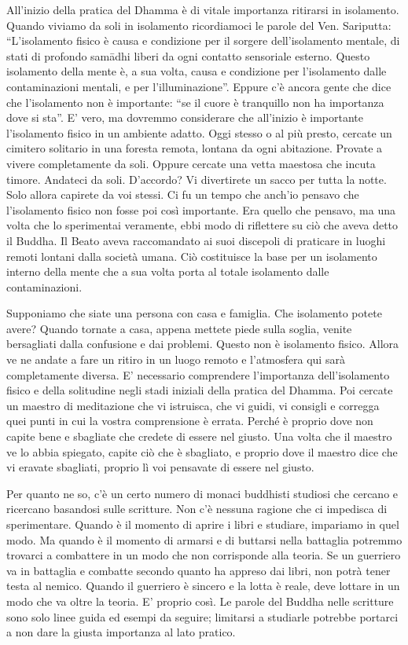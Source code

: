 All'inizio della pratica del Dhamma è di vitale importanza ritirarsi in
isolamento. Quando viviamo da soli in isolamento ricordiamoci le parole
del Ven. Sariputta: ``L'isolamento fisico è causa e condizione per il
sorgere dell'isolamento mentale, di stati di profondo samādhi liberi da
ogni contatto sensoriale esterno. Questo isolamento della mente è, a sua
volta, causa e condizione per l'isolamento dalle contaminazioni mentali,
e per l'illuminazione''. Eppure c'è ancora gente che dice che
l'isolamento non è importante: ``se il cuore è tranquillo non ha
importanza dove si sta''. E' vero, ma dovremmo considerare che
all'inizio è importante l'isolamento fisico in un ambiente adatto. Oggi
stesso o al più presto, cercate un cimitero solitario in una foresta
remota, lontana da ogni abitazione. Provate a vivere completamente da
soli. Oppure cercate una vetta maestosa che incuta timore. Andateci da
soli. D'accordo? Vi divertirete un sacco per tutta la notte. Solo allora
capirete da voi stessi. Ci fu un tempo che anch'io pensavo che
l'isolamento fisico non fosse poi così importante. Era quello che
pensavo, ma una volta che lo sperimentai veramente, ebbi modo di
riflettere su ciò che aveva detto il Buddha. Il Beato aveva raccomandato
ai suoi discepoli di praticare in luoghi remoti lontani dalla società
umana. Ciò costituisce la base per un isolamento interno della mente che
a sua volta porta al totale isolamento dalle contaminazioni.

Supponiamo che siate una persona con casa e famiglia. Che isolamento
potete avere? Quando tornate a casa, appena mettete piede sulla soglia,
venite bersagliati dalla confusione e dai problemi. Questo non è
isolamento fisico. Allora ve ne andate a fare un ritiro in un luogo
remoto e l'atmosfera qui sarà completamente diversa. E' necessario
comprendere l'importanza dell'isolamento fisico e della solitudine negli
stadi iniziali della pratica del Dhamma. Poi cercate un maestro di
meditazione che vi istruisca, che vi guidi, vi consigli e corregga quei
punti in cui la vostra comprensione è errata. Perché è proprio dove non
capite bene e sbagliate che credete di essere nel giusto. Una volta che
il maestro ve lo abbia spiegato, capite ciò che è sbagliato, e proprio
dove il maestro dice che vi eravate sbagliati, proprio lì voi pensavate
di essere nel giusto.

Per quanto ne so, c'è un certo numero di monaci buddhisti studiosi che
cercano e ricercano basandosi sulle scritture. Non c'è nessuna ragione
che ci impedisca di sperimentare. Quando è il momento di aprire i libri
e studiare, impariamo in quel modo. Ma quando è il momento di armarsi e
di buttarsi nella battaglia potremmo trovarci a combattere in un modo
che non corrisponde alla teoria. Se un guerriero va in battaglia e
combatte secondo quanto ha appreso dai libri, non potrà tener testa al
nemico. Quando il guerriero è sincero e la lotta è reale, deve lottare
in un modo che va oltre la teoria. E' proprio così. Le parole del Buddha
nelle scritture sono solo linee guida ed esempi da seguire; limitarsi a
studiarle potrebbe portarci a non dare la giusta importanza al lato
pratico.

